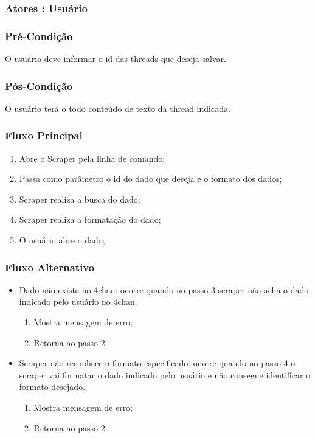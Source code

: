 \subsubsection{Atores : Usuário}
\subsubsection{Pré-Condição}
O usuário deve informar o id das threads que deseja salvar.
\subsubsection{Pós-Condição}
O usuário terá o todo conteúdo de texto da thread indicada.
\subsubsection{Fluxo Principal}
\begin{enumerate}
    \item Abre o Scraper pela linha de comando;
    \item Passa como parâmetro o id do dado que deseja e o formato dos dados;
    \item Scraper realiza a busca do dado;
    \item Scraper realiza a formatação do dado;
    \item O usuário abre o dado;
\end{enumerate}
\subsubsection{Fluxo Alternativo}
\begin{itemize}
    \item Dado não existe no 4chan: ocorre quando no passo 3 scraper não acha o dado indicado pelo usuário no 4chan.
    \begin{enumerate}
        \item Mostra mensagem de erro;
        \item Retorna ao passo 2.
    \end{enumerate}
    \item Scraper não reconhece o formato especificado: ocorre quando no passo 4 o scraper vai formatar o dado indicado pelo usuário e não consegue identificar o formato desejado.
    \begin{enumerate}
        \item Mostra mensagem de erro;
        \item Retorna ao passo 2.
    \end{enumerate}
\end{itemize}

